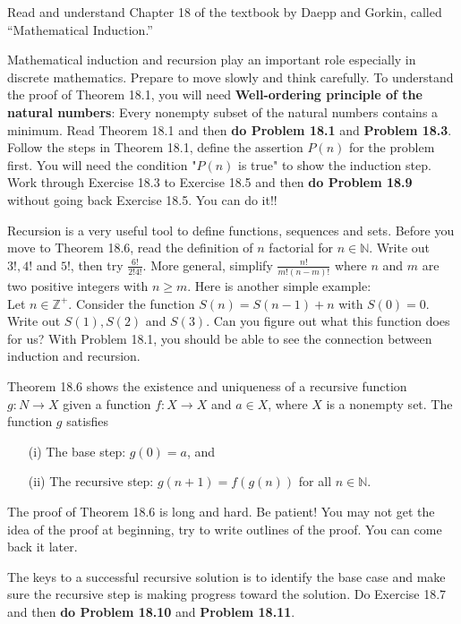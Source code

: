 
Read and understand Chapter 18 of the textbook by Daepp and Gorkin, called ``Mathematical Induction.''

Mathematical induction and recursion play an important role especially in discrete mathematics. Prepare to move slowly and think carefully. To understand the proof of Theorem 18.1, you will need {\bf Well-ordering principle of the natural numbers}: Every nonempty subset of the natural numbers contains a minimum.
Read Theorem 18.1 and then {\bf do Problem 18.1} and {\bf Problem 18.3}. Follow the steps in Theorem 18.1, define the assertion $P(n)$ for the problem first. You will need the condition "$P(n)$ is true" to show the induction step. Work through Exercise 18.3 to Exercise 18.5 and then {\bf do Problem 18.9} without going back Exercise 18.5. You can do it!!

Recursion is a very useful tool to define functions, sequences and sets. Before you move to Theorem 18.6, read the definition of $n$ factorial for $n\in \mathbb{N}$. Write out $3!, 4!$ and $5!$, then try $\frac{6!}{2!4!}$. More general, simplify $\frac{n!}{m!(n-m)!}$ where $n$ and $m$ are two positive integers with $n\geq m$. Here is another simple example:\\
Let $n\in \mathbb{Z^+}$. Consider the function $S(n) = S(n-1) + n$ with $S(0) = 0$. Write out $S(1), S(2)$ and $S(3)$. Can you figure out what this function does for us? With Problem 18.1, you should be able to see the connection between induction and recursion.

Theorem 18.6 shows the existence and uniqueness of a recursive function $g: N \rightarrow X$ given a function $f: X \rightarrow X$ and $a\in X$, where $X$ is a nonempty set. The function $g$ satisfies
\begin{itemize}
\item[(i)] The base step: $g(0) = a$, and
\item[(ii)] The recursive step: $g(n+1)=f(g(n))$ for all $n \in \mathbb{N}$.
\end{itemize}

\noindent The proof of Theorem 18.6 is long and hard. Be patient! You may not get the idea of the proof at beginning, try to write outlines of the proof. You can come back it later.

The keys to a successful recursive solution is to identify the base case and make sure the recursive step is making progress toward the solution. Do Exercise 18.7 and then {\bf do Problem 18.10} and {\bf Problem 18.11}.

